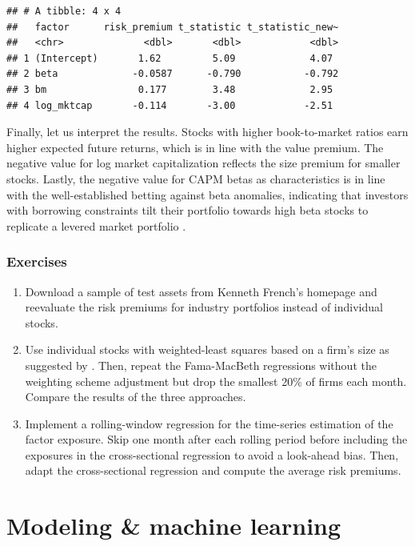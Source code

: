 \documentclass[
]{krantz}
\providecommand{\tightlist}{%
  \setlength{\itemsep}{0pt}\setlength{\parskip}{0pt}}
\begin{document}
\begin{verbatim}
## # A tibble: 4 x 4
##   factor      risk_premium t_statistic t_statistic_new~
##   <chr>              <dbl>       <dbl>            <dbl>
## 1 (Intercept)       1.62         5.09             4.07 
## 2 beta             -0.0587      -0.790           -0.792
## 3 bm                0.177        3.48             2.95 
## 4 log_mktcap       -0.114       -3.00            -2.51
\end{verbatim}

Finally, let us interpret the results. Stocks with higher book-to-market ratios earn higher expected future returns, which is in line with the value premium. The negative value for log market capitalization reflects the size premium for smaller stocks. Lastly, the negative value for CAPM betas as characteristics is in line with the well-established betting against beta anomalies, indicating that investors with borrowing constraints tilt their portfolio towards high beta stocks to replicate a levered market portfolio \citep{Frazzini2014}.

\hypertarget{exercises-6}{%
\section{Exercises}\label{exercises-6}}

\begin{enumerate}
\def\labelenumi{\arabic{enumi}.}
\tightlist
\item
  Download a sample of test assets from Kenneth French's homepage and reevaluate the risk premiums for industry portfolios instead of individual stocks.
\item
  Use individual stocks with weighted-least squares based on a firm's size as suggested by \citet{Hou2020}. Then, repeat the Fama-MacBeth regressions without the weighting scheme adjustment but drop the smallest 20\% of firms each month. Compare the results of the three approaches.
\item
  Implement a rolling-window regression for the time-series estimation of the factor exposure. Skip one month after each rolling period before including the exposures in the cross-sectional regression to avoid a look-ahead bias. Then, adapt the cross-sectional regression and compute the average risk premiums.
\end{enumerate}

\hypertarget{part-modeling-machine-learning}{%
\part*{Modeling \& machine learning}\label{part-modeling-machine-learning}}
\end{document}
